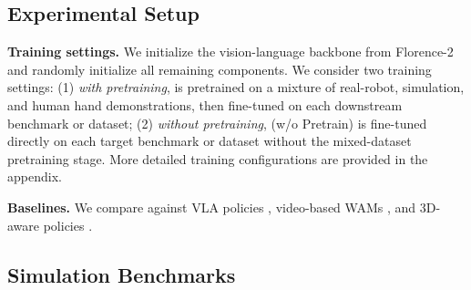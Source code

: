 \vspace{-0.2cm}

\subsection{Experimental Setup}
\label{sec:experiments:setup}
\vspace{-0.2cm}

\noindent\textbf{Training settings.}
We initialize the vision-language backbone from
Florence-2~\citep{xiao2023florence2} and randomly initialize all remaining
components. We consider two training settings: (1) \emph{with pretraining},
\method{} is pretrained on a mixture of real-robot, simulation, and
human hand demonstrations, then fine-tuned on each downstream benchmark
or dataset; (2) \emph{without pretraining}, \method{} (w/o Pretrain) is
fine-tuned directly on each target benchmark or dataset without the
mixed-dataset pretraining stage. More detailed training configurations
are provided in the appendix.

\noindent\textbf{Baselines.}
We compare against VLA policies
\citep{zheng2025xvla,sun2026vlajepa,black2024pizero,physicalintelligence2025pi05,abotm0},
video-based WAMs \citep{cosmospolicy,genieenvisioner,bi2025motus,li2026lingbotva,yuan2026fastwam}, and
3D-aware policies
\citep{qu2025spatialvla,wang2026lamp,guo2026xwam,zhou2026dexbev}.

\vspace{-0.2cm}

\subsection{Simulation Benchmarks}
\label{sec:experiments:simulation}
\vspace{-0.2cm}

